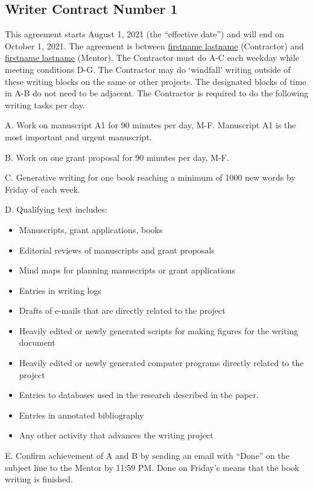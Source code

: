 \documentclass[9pt]{article}
\begin{document}
\thispagestyle{empty}
\subsection*{Writer Contract Number 1}
This agreement starts August 1, 2021 (the ``effective date'') and will end on October 1, 2021. 
The agreement is between \underline{firstname lastname}  (Contractor) and \underline{firstname lastname} (Mentor). 
The Contractor must do A-C each weekday while meeting conditions D-G.
The Contractor may do `windfall' writing outside of these writing blocks on the same or other projects. 
The designated blocks of time in A-B do not need to be adjacent.
The Contractor is required to do the following writing tasks per day.

A. Work on manuscript A1 for 90 minutes per day, M-F. 
Manuscript A1 is the most important and urgent manuscript.

B. Work on one grant proposal for 90 minutes per day, M-F. 

C. Generative writing for one book reaching a minimum of 1000 new words by Friday of each week.

D. Qualifying text includes: 

\begin{itemize}
\item Manuscripts, grant applications, books
\item Editorial reviews of manuscripts and grant proposals
\item Mind maps for planning manuscripts or grant applications
\item Entries in writing logs
\item Drafts of e-mails that are directly related to the project
\item Heavily edited or newly generated scripts for making figures for the writing document
\item Heavily edited or newly generated computer programs directly related to the project
\item Entries to databases used in the research described in the paper.
\item Entries in annotated bibliography
\item Any other activity that advances the writing project
\end{itemize}


E. Confirm achievement of A and B by sending an email with ``Done'' on the subject line to the Mentor by 11:59 PM. 
Done on Friday's means that the book writing is finished.
\end{document}
